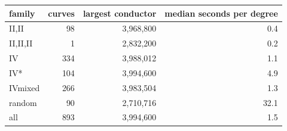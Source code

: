 \begin{tabular}{lrrr}
\hline
family & curves & largest conductor & median seconds per degree \\
\hline
II,II & 98 & 3,968,800 & 0.4 \\
II,II,II & 1 & 2,832,200 & 0.2 \\
IV & 334 & 3,988,012 & 1.1 \\
IV* & 104 & 3,994,600 & 4.9 \\
IVmixed & 266 & 3,983,504 & 1.3 \\
random & 90 & 2,710,716 & 32.1 \\
all & 893 & 3,994,600 & 1.5 \\
\hline
\end{tabular}
